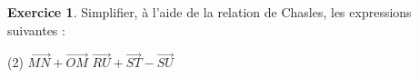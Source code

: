 \documentclass{exam}
\theoremstyle{definition}
\newtheorem{exercice}{Exercice}
\begin{document}
\begin{exercice}
    Simplifier, à l'aide de la relation de Chasles, les expressions suivantes :
    \begin{tasks}[style=enumerate](2)
        \task $\overrightarrow{MN} + \overrightarrow{OM}$
        \task $\overrightarrow{RU} + \overrightarrow{ST} - \overrightarrow{SU}$
    \end{tasks}
    
\end{exercice}


% 
\end{document}
